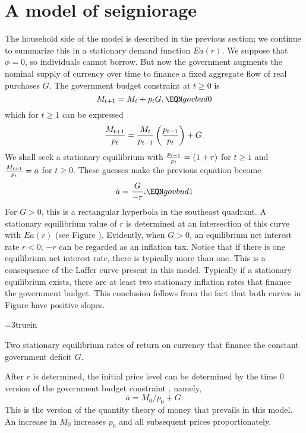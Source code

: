\section{A model of seigniorage}

The household side of the model is described in the previous section;
we continue to summarize this in a stationary demand function $Ea(r)$.
We suppose that $\phi = 0$, so  individuals cannot borrow.
But now the government augments the nominal
supply of currency over time to finance a fixed aggregate
flow of real purchases  $G$.
The government budget constraint at $t\geq 0$ is
$$ M_{t+1} = M_t + p_t G, \EQN govbud0 $$
which for $t \geq 1$ can be expressed
$$ {M_{t+1} \over p_t} = {M_t \over p_{t-1}} \left({p_{t-1}
     \over p_t} \right) + G. $$
We shall seek a stationary  equilibrium with ${p_{t-1}\over p_t} = (1+r)$
for $t \geq 1$ and ${M_{t+1} \over p_t } = \bar a $ for
$t\geq 0$.  These guesses make the previous equation
become
$$ \bar a = {G \over -r}. \EQN govbud1 $$
For $G > 0$, this is a rectangular hyperbola in the southeast
quadrant.  A stationary equilibrium value of  $r$ is determined
at an intersection of this curve with $E a(r)$ (see Figure ).
 Evidently,
when $G > 0$, an equilibrium net interest rate
 $r <0$; $-r$ can be regarded as an inflation tax.
Notice that if there is one equilibrium net interest rate, there is typically
more than one.  This is a consequence of the Laffer curve present
in this model.
%
 Typically if a
stationary equilibrium exists,
there are at least two stationary inflation rates that finance
the government budget. This conclusion follows from the fact that
both curves in Figure  have positive slopes.


\centerline{\epsfxsize=3truein}
\caption{Two stationary equilibrium rates of return on currency that finance the
constant government deficit $G$.}
\endfigure

After $r$ is determined, the initial price level can be determined
by the time $0$ version of the government budget constraint ,
namely,
$$ \bar a = M_0/p_0 + G.   $$
This is the version of the quantity theory of money that prevails in this model.
An increase in $M_0$ increases $p_0$ and all subsequent prices proportionately.

